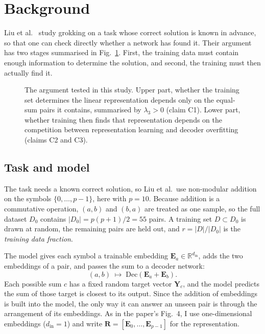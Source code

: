 
\section{Background}
\label{sec:background}


Liu et al.~\cite{liu2022grokking} study grokking on a task whose correct
solution is known in advance, so that one can check directly whether a
network has found it. Their argument has two stages summarised in
Fig.~\ref{fig:pipeline}. First, the training data must contain enough information
to determine the solution, and second, the training must then actually find it.

\begin{figure}[t]
  \centering
  
  \caption{The argument tested in this study. Upper part, whether the
  training set determines the linear representation depends only on the
  equal-sum pairs it contains, summarised by $\lambda_3 > 0$ (claim C1).
  Lower part, whether training then finds that representation depends on
  the competition between representation learning and decoder overfitting
  (claims C2 and C3).}
  \label{fig:pipeline}
\end{figure}

\subsection{Task and model}
\label{sec:task}

The task needs a known correct solution, so Liu et al.\ use non-modular
addition on the symbols $\{0, \dots, p-1\}$, here with $p = 10$. Because addition is a commutative operation, $(a,b)$ and $(b,a)$ are treated as
one sample, so the full dataset $D_0$ contains $|D_0| = p(p+1)/2 = 55$ pairs.
A training set $D \subset D_0$ is drawn at random, the remaining pairs are
held out, and $r = |D|/|D_0|$ is the \emph{training data fraction}.

The model gives each symbol a trainable embedding
$\mathbf{E}_a \in \mathbb{R}^{d_{\mathrm{in}}}$, adds the two embeddings of a
pair, and passes the sum to a decoder network:
%
\begin{equation}
  (a,b) \;\longmapsto\; \mathrm{Dec}\!\left(\mathbf{E}_a + \mathbf{E}_b\right).
  \label{eq:toymodel}
\end{equation}
%
Each possible sum $c$ has a fixed random target vector $\mathbf{Y}_c$, and the
model predicts the sum of those target is closest to its output. Since the
addition of embeddings is built into the model, the only way it can answer an
unseen pair is through the arrangement of its embeddings. As in the paper's Fig.~4, I use one-dimensional embeddings ($d_{\mathrm{in}} = 1$) and write
$\mathbf{R} = [\mathbf{E}_0, \dots, \mathbf{E}_{p-1}]$ for the representation.

